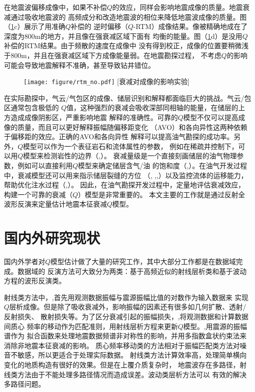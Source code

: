 在地震波偏移成像中，如果不补偿$Q$的效应，同样会影响地震成像的质量。地震衰减通过吸收地震波的
高频成分和改造地震波的相位来降低地震波成像的质量。图（\ref{fig:qrtm}c）展示了用准确$Q$补偿的
逆时偏移（$Q$-RTM）成像结果。像被精确地成在了深度为800m的地方，并且像在强衰减区域下面有
均衡的能量。图（\ref{fig:qrtm}d）是没用$Q$补偿的RTM结果。由于频散的速度在成像中
没有得到校正，成像的位置要稍微浅于800m，并且在强衰减区域下方成像能量弱。在地震勘探过程，
不考虑$Q$的影响可能会导致地震解释不准确，甚至导致钻井错位。

\begin{figure}[!htbp]
        \centering
        \texttt{[image: figure/rtm\_no.pdf]}
		[衰减对成像的影响实验]
        \label{fig:qrtm}
\end{figure}

在实际勘探中，气云/气包区的成像、储层识别和解释都面临巨大的挑战。气云/包区通常包含极低的
$Q$值，这种强烈的衰减会吸收深部同相轴的能量，在储层的上方造成成像阴影区，严重影响地震
解释的准确性。可靠的$Q$模型不仅可以提高成像的质量，而且可以更好解释振幅随偏移距变化
（AVO）和各向异性这两种依赖于偏移距的效应。正确的AVO和各向异性
解释可以提高油气勘探的成功率。另外，$Q$模型可以作为一个表征岩石和流体属性的参数，
例如在稀疏井控制下，可以用$Q$模型来检测岩性的边界（,）。
衰减量级是一个直接刻画储层的油气物理参数，例如可以直接利用$Q$模型来确定储层含气/油
的饱和度（,）。在油气开发过程中，衰减模型还可以用来指示储层裂缝的方位
（, ,,）以及监控流体的运移能力，
帮助优化注水过程（,）。
因此，在油气勘探开发过程中，定量地评估衰减效应，构建一个可靠的衰减（$Q$）模型是非常重要的。
本文主要的工作就是通过反射全波形反演来定量估计地震本征衰减$Q$模型。

\vspace{0.5cm}
\section{国内外研究现状}

国内外学者对$Q$模型估计做了大量的研究工作，其中大部分工作都是在数据域完成。数据域的
反演方法可大致分为两类：基于高频近似的射线层析类和基于波动方程的波形反演类。

射线类方法中，,首先用观测数据振幅与震源振幅比值的对数作为输入数据来
实现$Q$层析成像。但是除了吸收衰减外，影响振幅的因素还有很多如几何扩散、透射/反射损失、
散射损失等。为了区分衰减引起的振幅损失，,将观测数据和计算数据间质心
频率的移动作为匹配准则，用射线层析方程来更新$Q$模型。,用震源的振幅谱作为
拟合函数来处理地震数据频谱非对称性的影响，并用多指数盒状约束法来消除非地震本征衰减的影响。
质心频率移动类的方法相对于振幅匹配类方法对噪音不敏感，所以更适合于处理实际数据。
射线类方法计算效率高，处理简单横向变化的地质构造有很好的效果。但是在上覆介质复杂时，
地震波存在多路径，射线类方法由于不能处理多路径情况而造成误差。波动类层析方法可以
有效的解决多路径问题。

